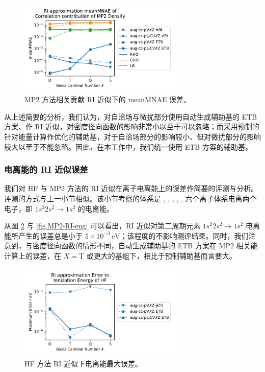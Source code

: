 \begin{figure}[t]
  \centering
  \caption{MP2 方法相关贡献 RI 近似下的 meanMNAE 误差。}
  \label{fig.MP2-RI-mean}
  \includegraphics[width=0.7\textwidth]{assets/MP2-RI-mean.pdf}
\end{figure}

从上述简要的分析，我们认为，对自洽场与微扰部分使用自动生成辅助基的 ETB 方案、作 RI 近似，对密度径向函数的影响非常小以至于可以忽略；而采用预制的针对能量计算作优化的辅助基，对于自洽场部分的影响较小、但对微扰部分的影响较大以至于不能忽略。因此，在本工作中，我们统一使用 ETB 方案的辅助基。

\subsubsection{电离能的 RI 近似误差}

我们对 HF 与 MP2 方法的 RI 近似在离子电离能上的误差作简要的评测与分析。评测的方式与上一小节相似。该小节考察的体系是 , , , , ,  六个离子体系电离两个电子，即 $1s^2 2s^2 \rightarrow 1s^2$ 的电离能。

从图 \ref{fig.HF-RI-eng} 与 \ref{fig.MP2-RI-eng} 可以看出，RI 近似对第二周期元素 $1s^2 2s^2 \rightarrow 1s^2$ 电离能所产生的误差总是小于 $5 \times 10^{-3} \, \text{eV}$；该程度的不影响测评结果。同时，我们注意到，与密度径向函数的情形不同，自动生成辅助基的 ETB 方案在 MP2 相关能计算上的误差，在 $X=\mathrm{T}$ 或更大的基组下，相比于预制辅助基而言要大。

\begin{figure}[t]
    \centering
    \caption{HF 方法 RI 近似下电离能最大误差。}
    \label{fig.HF-RI-eng}
    \includegraphics[width=0.7\textwidth]{assets/HF-RI-eng.pdf}
\end{figure}

